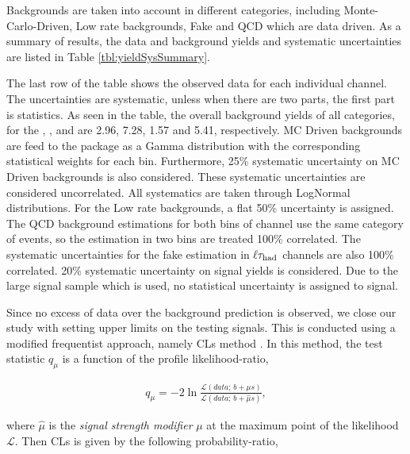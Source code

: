 Backgrounds are taken into account in different categories, including Monte-Carlo-Driven, Low rate backgrounds, Fake and QCD which are data driven.
As a summary of results, the data and background yields and systematic uncertainties are listed in Table \ref{tbl:yieldSysSummary}. 

The last row of the table shows the observed data for  each individual channel.  The uncertainties are systematic, unless when there are 
two parts, the first part is statistics.
As seen in the table, the overall background yields of all categories, 
for the \eTau, \muTau, \tauTau \binone and \bintwo are  
2.96, 7.28, 1.57 and 5.41, respectively.
MC Driven backgrounds are feed to the package as a Gamma distribution with the corresponding statistical weights for each bin.
Furthermore, 25\% systematic uncertainty on MC Driven backgrounds is also considered. These systematic uncertainties are considered uncorrelated.
All systematics are taken through LogNormal distributions. For the Low rate backgrounds, a flat 50\% uncertainty is assigned.
The QCD background estimations for 
both bins of \tauTau channel use the same category of events, so the estimation in two bins are treated 100\% correlated. 
The systematic uncertainties for the fake estimation in $\ell\tau_{\rm had}$ channels are also 100\% correlated. 
20\% systematic uncertainty on signal yields is considered. 
Due to the large signal sample which is used, no statistical uncertainty is assigned to signal.

Since no excess of data over the background prediction is observed, 
we close our study with setting upper limits on the testing signals.
This is conducted using a modified frequentist approach, namely CLs method \cite{read:CLs}.
In this method, the test statistic $q_\mu$ 
is a function of the profile likelihood-ratio,

\begin{align}
q_\mu = -2 \ln \frac{\mathcal{L}(data ;\, b + \mu s)}{\mathcal{L}(data ;\, b + \hat{\mu} s)},
\end{align}

where $\hat\mu$ is the \textit{signal strength modifier} $\mu$ at the maximum point of the likelihood $\mathcal{L}$.
Then CLs is given by the following probability-ratio,

